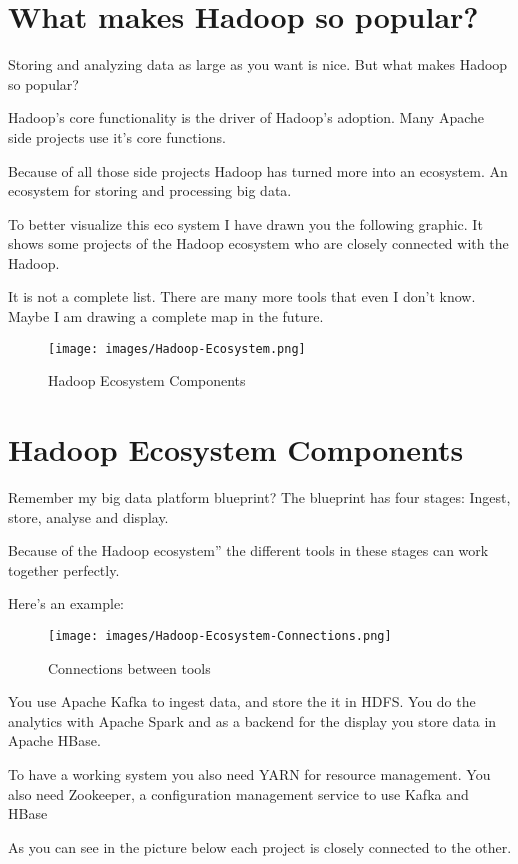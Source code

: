 \documentclass[12pt, numbers=noenddot]{scrreprt} %
\begin{document}
\section{What makes Hadoop so popular?}
Storing and analyzing data as large as you want is nice. But what makes Hadoop so popular?

Hadoop’s core functionality is the driver of Hadoop’s adoption. Many Apache side projects use it’s core functions.

Because of all those side projects Hadoop has turned more into an ecosystem. An ecosystem for storing and processing big data.

To better visualize this eco system I have drawn you the following graphic. It shows some projects of the Hadoop ecosystem who are closely connected with the Hadoop.

It is not a complete list. There are many more tools that even I don’t know. Maybe I am drawing a complete map in the future.

\begin{figure}[htbp]
  \centering
     \texttt{[image: images/Hadoop-Ecosystem.png]}
  \caption{Hadoop Ecosystem Components}
  \label{fig:Bild1}
\end{figure}

\section{Hadoop Ecosystem Components}
Remember my big data platform blueprint? The blueprint has four stages: Ingest, store, analyse and display.

Because of the Hadoop ecosystem” the different tools in these stages can work together perfectly.

Here’s an example:
\begin{figure}[htbp]
  \centering
     \texttt{[image: images/Hadoop-Ecosystem-Connections.png]}
  \caption{Connections between tools}
  \label{fig:Bild1}
\end{figure}

You use Apache Kafka to ingest data, and store the it in HDFS. You do the analytics with Apache Spark and as a backend for the display you store data in Apache HBase.

To have a working system you also need YARN for resource management. You also need Zookeeper, a configuration management service to use Kafka and HBase

As you can see in the picture below each project is closely connected to the other.
\end{document}
